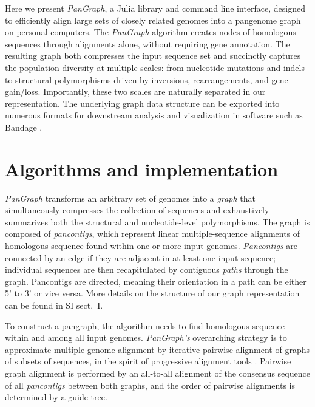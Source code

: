 \documentclass[aps,rmp,preprint,superscriptaddress,10pt,linenumbers]{revtex4-1}
\newcommand{\SIgraph}{I}
\begin{document}
Here we present \emph{PanGraph}, a Julia \cite{bezanson2017julia} library and command line interface, designed to efficiently align large sets of closely related genomes into a pangenome graph on personal computers. The \emph{PanGraph} algorithm creates nodes of homologous sequences through alignments alone, without requiring gene annotation.
The resulting graph both compresses the input sequence set and succinctly captures the population diversity at multiple scales: from nucleotide mutations and indels to structural polymorphisms driven by inversions, rearrangements, and gene gain/loss. Importantly, these two scales are naturally separated in our representation.
The underlying graph data structure can be exported into numerous formats for downstream analysis and visualization in software such as Bandage \cite{wick2015bandage}.

\section{Algorithms and implementation}
\emph{PanGraph} transforms an arbitrary set of genomes into a \emph{graph} that simultaneously compresses the collection of sequences and exhaustively summarizes both the structural and nucleotide-level polymorphisms.
The graph is composed of \emph{pancontigs}, which represent linear multiple-sequence alignments of homologous sequence found within one or more input genomes.
\emph{Pancontigs} are connected by an edge if they are adjacent in at least one input sequence; individual sequences are then recapitulated by contiguous \emph{paths} through the graph.
Pancontigs are directed, meaning their orientation in a path can be either 5' to 3' or vice versa.
More details on the structure of our graph representation can be found in SI sect.~\SIgraph{}.

To construct a pangraph, the algorithm needs to find homologous sequence within and among all input genomes.
\emph{PanGraph's} overarching strategy is to approximate multiple-genome alignment by iterative pairwise alignment of graphs of subsets of sequences, in the spirit of progressive alignment tools \cite{feng1987progressive,darling2010progressivemauve,armstrong2020progressive}.
Pairwise graph alignment is performed by an all-to-all alignment of the consensus sequence of all \emph{pancontigs} between both graphs, and the order of pairwise alignments is determined by a guide tree.
\end{document}
